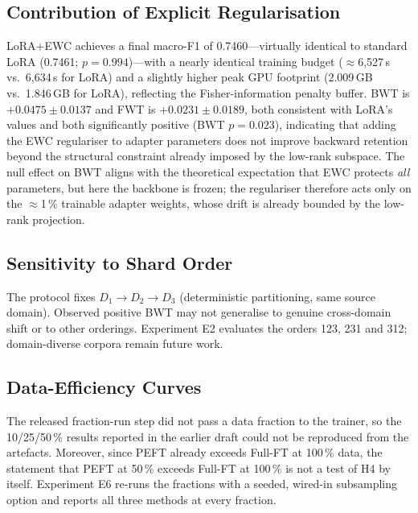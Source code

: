 \documentclass[11pt,a4paper]{article}
\begin{document}
\subsection{Contribution of Explicit Regularisation}

LoRA+EWC achieves a final macro-F1 of 0.7460---virtually identical to
standard LoRA (0.7461; $p = 0.994$)---with a nearly identical training
budget ($\approx$6,527\,s vs.\ 6,634\,s for LoRA) and a slightly
higher peak GPU footprint (2.009\,GB vs.\ 1.846\,GB for LoRA), reflecting
the Fisher-information penalty buffer.  BWT is $+0.0475 \pm 0.0137$
and FWT is $+0.0231 \pm 0.0189$, both consistent with LoRA's values and
both significantly positive (BWT $p=0.023$), indicating that adding the
EWC regulariser to adapter parameters does not improve backward retention
beyond the structural constraint already imposed by the low-rank subspace.
The null effect on BWT aligns with the theoretical expectation that EWC
protects \emph{all} parameters, but here the backbone is frozen; the
regulariser therefore acts only on the $\approx$1\,\% trainable adapter
weights, whose drift is already bounded by the low-rank projection.

\subsection{Sensitivity to Shard Order}

The protocol fixes $D_1 \to D_2 \to D_3$ (deterministic partitioning,
same source domain).  Observed positive BWT may not generalise to
genuine cross-domain shift or to other orderings.  Experiment E2
evaluates the orders 123, 231 and 312; domain-diverse corpora remain
future work.

\subsection{Data-Efficiency Curves}

The released fraction-run step did not pass a data fraction to the
trainer, so the 10/25/50\,\% results reported in the earlier draft
could not be reproduced from the artefacts.  Moreover, since PEFT
already exceeds Full-FT at 100\,\% data, the statement that PEFT at
50\,\% exceeds Full-FT at 100\,\% is not a test of H4 by itself.
Experiment E6 re-runs the fractions with a seeded, wired-in
subsampling option and reports all three methods at every fraction.

\end{document}
